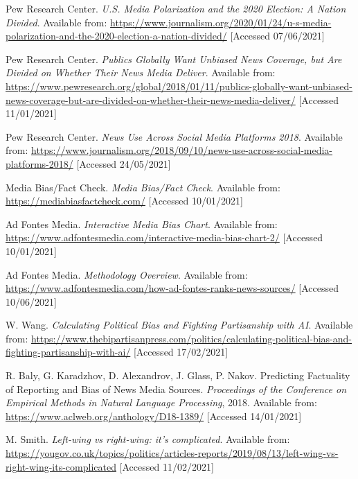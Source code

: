 \begin{thebibliography}{9}

Pew Research Center. \textit{U.S. Media Polarization and the 2020 Election: A Nation Divided}. 
Available from: \url{https://www.journalism.org/2020/01/24/u-s-media-polarization-and-the-2020-election-a-nation-divided/} [Accessed 07/06/2021]

Pew Research Center. \textit{Publics Globally Want Unbiased News Coverage, but Are Divided on Whether Their News Media Deliver}. Available from: \url{https://www.pewresearch.org/global/2018/01/11/publics-globally-want-unbiased-news-coverage-but-are-divided-on-whether-their-news-media-deliver/} [Accessed 11/01/2021]

Pew Research Center. \textit{News Use Across Social Media Platforms 2018}. Available from: \url{https://www.journalism.org/2018/09/10/news-use-across-social-media-platforms-2018/} [Accessed 24/05/2021]

Media Bias/Fact Check. \textit{Media Bias/Fact Check}. Available from: \url{https://mediabiasfactcheck.com/} [Accessed 10/01/2021]

Ad Fontes Media. \textit{Interactive Media Bias Chart}. Available from: \url{https://www.adfontesmedia.com/interactive-media-bias-chart-2/} [Accessed 10/01/2021]

Ad Fontes Media. \textit{Methodology Overview}. Available from: \url{https://www.adfontesmedia.com/how-ad-fontes-ranks-news-sources/} [Accessed 10/06/2021]

W. Wang. \textit{Calculating Political Bias and Fighting Partisanship with AI}. Available from: \url{https://www.thebipartisanpress.com/politics/calculating-political-bias-and-fighting-partisanship-with-ai/} [Accessed 17/02/2021]

R. Baly, G. Karadzhov, D. Alexandrov, J. Glass, P. Nakov. Predicting Factuality of Reporting and Bias of News Media Sources. \textit{Proceedings of the Conference on Empirical Methods in Natural Language Processing}, 2018. Available from: \url{https://www.aclweb.org/anthology/D18-1389/} [Accessed 14/01/2021]

M. Smith. \textit{Left-wing vs right-wing: it’s complicated}. Available from: 
\url{https://yougov.co.uk/topics/politics/articles-reports/2019/08/13/left-wing-vs-right-wing-its-complicated} [Accessed 11/02/2021]


\end{thebibliography}
